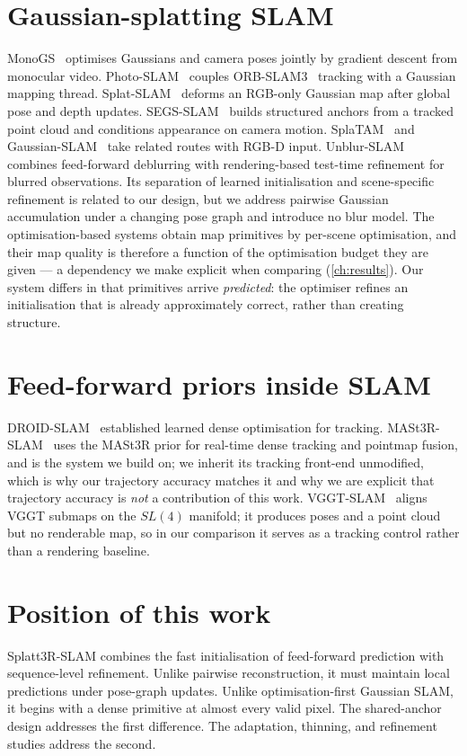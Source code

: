 \section{Gaussian-splatting SLAM}
MonoGS~\cite{matsuki2024monogs} optimises Gaussians and camera poses jointly by
gradient descent from monocular video. Photo-SLAM~\cite{huang2024photoslam}
couples ORB-SLAM3~\cite{campos2021orbslam3} tracking with a
Gaussian mapping thread. Splat-SLAM~\cite{sandstrom2025splatslam}
deforms an RGB-only Gaussian map after global pose and depth updates.
SEGS-SLAM~\cite{wen2025segsslam} builds structured anchors from a tracked
point cloud and conditions appearance on camera motion. SplaTAM~\cite{keetha2024splatam} and
Gaussian-SLAM~\cite{yugay2023gaussianslam} take related routes with RGB-D
input. Unblur-SLAM~\cite{zhang2026unblur} combines feed-forward deblurring
with rendering-based test-time refinement for blurred observations.
Its separation of learned initialisation and scene-specific refinement is
related to our design, but we address pairwise Gaussian accumulation under
a changing pose graph and introduce no blur model.
The optimisation-based systems obtain map primitives by per-scene optimisation, and their
map quality is therefore a function of the optimisation budget they are given
--- a dependency we make explicit when comparing
(\cref{ch:results}). Our system differs in that primitives arrive
\emph{predicted}: the optimiser refines an initialisation that is already
approximately correct, rather than creating structure.

\section{Feed-forward priors inside SLAM}
DROID-SLAM~\cite{teed2021droidslam} established learned dense optimisation for
tracking. MASt3R-SLAM~\cite{murai2025mast3rslam} uses the MASt3R prior for
real-time dense tracking and pointmap fusion, and is the system we build on;
we inherit its tracking front-end unmodified, which is why our trajectory
accuracy matches it and why we are explicit that trajectory accuracy is
\emph{not} a contribution of this work.
VGGT-SLAM~\cite{maggio2025vggtslam} aligns VGGT submaps on the $SL(4)$
manifold; it produces poses and a point cloud but no renderable map, so in our
comparison it serves as a tracking control rather than a rendering baseline.

\section{Position of this work}
Splatt3R-SLAM combines the fast initialisation of feed-forward prediction
with sequence-level refinement. Unlike pairwise reconstruction, it must
maintain local predictions under pose-graph updates. Unlike optimisation-first
Gaussian SLAM, it begins with a dense primitive at almost every valid pixel.
The shared-anchor design addresses the first difference. The adaptation,
thinning, and refinement studies address the second.

